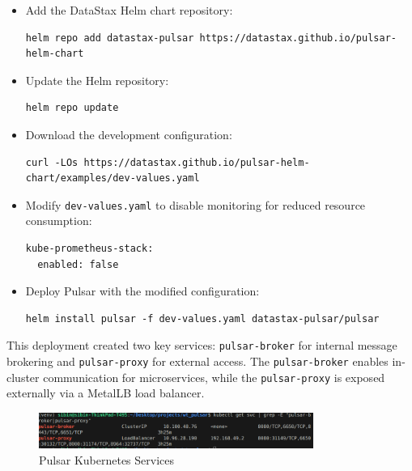 \begin{itemize}
    \item Add the DataStax Helm chart repository:
    \begin{lstlisting}[breaklines=true,basicstyle=\small\ttfamily,frame=single]
helm repo add datastax-pulsar https://datastax.github.io/pulsar-helm-chart
    \end{lstlisting}
    \item Update the Helm repository:
    \begin{lstlisting}[breaklines=true,basicstyle=\small\ttfamily,frame=single]
helm repo update
    \end{lstlisting}
    \item Download the development configuration:
    \begin{lstlisting}[breaklines=true,basicstyle=\small\ttfamily,frame=single]
curl -LOs https://datastax.github.io/pulsar-helm-chart/examples/dev-values.yaml
    \end{lstlisting}
    \item Modify \texttt{dev-values.yaml} to disable monitoring for reduced resource consumption:
    \begin{lstlisting}[breaklines=true,basicstyle=\small\ttfamily,frame=single]
kube-prometheus-stack:
  enabled: false
    \end{lstlisting}
    \item Deploy Pulsar with the modified configuration:
    \begin{lstlisting}[breaklines=true,basicstyle=\small\ttfamily,frame=single]
helm install pulsar -f dev-values.yaml datastax-pulsar/pulsar
    \end{lstlisting}
\end{itemize}

This deployment created two key services: \texttt{pulsar-broker} for internal message brokering and \texttt{pulsar-proxy} for external access. The \texttt{pulsar-broker} enables in-cluster communication for microservices, while the \texttt{pulsar-proxy} is exposed externally via a MetalLB load balancer.

\begin{figure}[h!]
    \centering
    \includegraphics[width=0.8\textwidth]{implementation/pulsar-svcs.png}
    \caption{Pulsar Kubernetes Services}
    \label{fig:kgetpods}
\end{figure}

